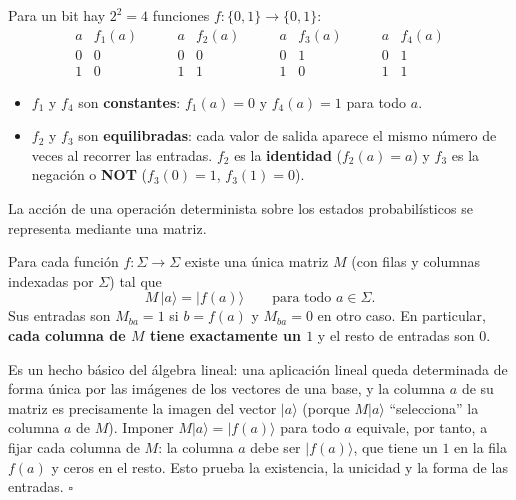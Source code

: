 \documentclass[11pt, a4paper, twoside, openright]{report}
\begin{document}
\noindent Para un bit hay $2^2 = 4$ funciones $f : \{0,1\} \to \{0,1\}$:
\[
\begin{array}{c|c} a & f_1(a) \\ \hline 0 & 0 \\ 1 & 0 \end{array}
\qquad
\begin{array}{c|c} a & f_2(a) \\ \hline 0 & 0 \\ 1 & 1 \end{array}
\qquad
\begin{array}{c|c} a & f_3(a) \\ \hline 0 & 1 \\ 1 & 0 \end{array}
\qquad
\begin{array}{c|c} a & f_4(a) \\ \hline 0 & 1 \\ 1 & 1 \end{array}
\]
\begin{itemize}
    \item $f_1$ y $f_4$ son \textbf{constantes}: $f_1(a) = 0$ y $f_4(a) = 1$ para todo $a$.
    \item $f_2$ y $f_3$ son \textbf{equilibradas}: cada valor de salida aparece el mismo número de veces al recorrer las entradas. $f_2$ es la \textbf{identidad} ($f_2(a) = a$) y $f_3$ es la negación o \textbf{NOT} ($f_3(0) = 1$, $f_3(1) = 0$).
\end{itemize}

\noindent La acción de una operación determinista sobre los estados probabilísticos se representa mediante una matriz.

\begin{tcolorbox}[colback=teal!5!white,colframe=teal!75!black,title=\textbf{Proposición: Matriz de una operación determinista}]
Para cada función $f : \Sigma \to \Sigma$ existe una única matriz $M$ (con filas y columnas indexadas por $\Sigma$) tal que
\[ M\,|a\rangle = |f(a)\rangle \qquad \text{para todo } a \in \Sigma. \]
Sus entradas son $M_{ba} = 1$ si $b = f(a)$ y $M_{ba} = 0$ en otro caso. En particular, \textbf{cada columna de $M$ tiene exactamente un $1$} y el resto de entradas son $0$.
\end{tcolorbox}

\begin{tcolorbox}[colback=gray!5!white,colframe=gray!75!black,title=\textbf{Demostración}]
Es un hecho básico del álgebra lineal: una aplicación lineal queda determinada de forma única por las imágenes de los vectores de una base, y la columna $a$ de su matriz es precisamente la imagen del vector $|a\rangle$ (porque $M|a\rangle$ ``selecciona'' la columna $a$ de $M$). Imponer $M|a\rangle = |f(a)\rangle$ para todo $a$ equivale, por tanto, a fijar cada columna de $M$: la columna $a$ debe ser $|f(a)\rangle$, que tiene un $1$ en la fila $f(a)$ y ceros en el resto. Esto prueba la existencia, la unicidad y la forma de las entradas. \hfill $\square$
\end{tcolorbox}
\end{document}
